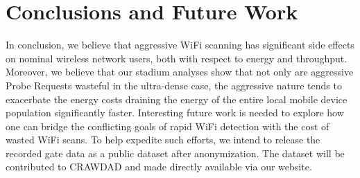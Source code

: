 \documentclass[conference]{IEEEtran}
\begin{document}
\section{Conclusions and Future Work}

In conclusion, we believe that aggressive WiFi scanning has significant side effects on nominal wireless network users, both with respect to energy and throughput.  Moreover, we believe that our stadium analyses show that not only are aggressive Probe Requests wasteful in the ultra-dense case, the aggressive nature tends to exacerbate the energy costs draining the energy of the entire local mobile device population significantly faster.  Interesting future work is needed to explore how one can bridge the conflicting goals of rapid WiFi detection with the cost of wasted WiFi scans. To help expedite such efforts, we intend to release the recorded gate data as a public dataset after anonymization.  The dataset will be contributed to CRAWDAD and made directly available via our website.  



  
\end{document}

